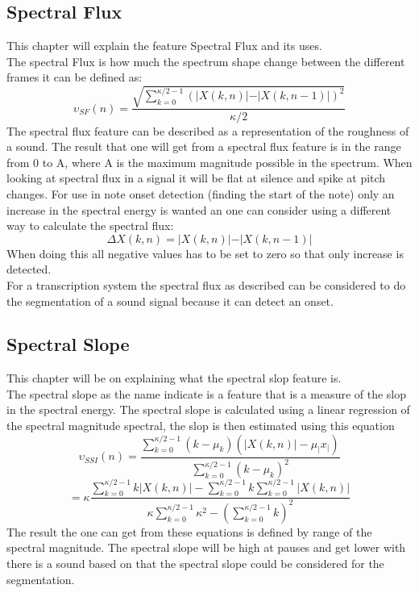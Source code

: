 \subsection{Spectral Flux}
This chapter will explain the feature Spectral Flux and its uses.\\
The spectral Flux is how much the spectrum shape change between the different frames it can be defined as\citep{ACA}:
\begin{equation}\label{Spectral Flux eq}
	\upsilon_{SF}(n) = \frac{\sqrt{\displaystyle\sum_{k=0}^{\kappa/2-1}(\vert X(k,n)\vert-\vert X(k,n-1)\vert)^2}}{\kappa/2}
\end{equation} 
The spectral flux feature can be described as a representation of the roughness of a sound. The result that one will get from a spectral flux feature is in the range from 0 to A, where A is the maximum magnitude possible in the spectrum\citep{ACA}. When looking at spectral flux in a signal it will be flat at silence and spike at pitch changes\citep{ACA}.
For use in note onset detection (finding the start of the note) only an increase in the spectral energy is wanted an one can consider using a different way to calculate the spectral flux\citep{ACA}:
\begin{equation}
	\Delta X(k,n) = \vert X(k,n)\vert-\vert X(k,n-1)\vert
\end{equation}
When doing this all negative values has to be set to zero so that only increase is detected\citep{ACA}.
\\
For a transcription system the spectral flux as described can be considered to do the segmentation of a sound signal because it can detect an onset.
\subsection{Spectral Slope}
This chapter will be on explaining what the spectral slop feature is.\\
The spectral slope as the name indicate is a feature that is a measure of the slop in the spectral energy\citep{ACA}. The spectral slope is calculated using a linear regression of the spectral magnitude spectral, the slop is then estimated using this equation\citep{ACA}
\begin{equation}
	\upsilon _{SSI} (n) = \frac{\displaystyle\sum_{k = 0}^{\kappa/2-1}(k - \mu_k)(\vert X(k,n)\vert - \mu_\vert x _\vert)}{\displaystyle\sum_{k = 0}^{\kappa/2-1}(k - \mu_k)^2}
\end{equation}
\begin{equation}
	= \kappa\frac{\displaystyle\sum_{k= 0}^{\kappa/2-1}k\vert X(k,n)\vert - \displaystyle\sum_{k = 0}^{\kappa/2-1}k\displaystyle\sum_{k = 0}^{\kappa/2-1}\vert X(k,n)\vert}{\kappa \displaystyle\sum_{k = 0}^{\kappa/2-1}\kappa^2-(\displaystyle\sum_{k = 0}^{\kappa/2-1}k)^2}
\end{equation}
The result the one can get from these equations is defined by range of the spectral magnitude.
The spectral slope will be high at pauses and get lower with there is a sound based on that the spectral slope could be considered for the segmentation.